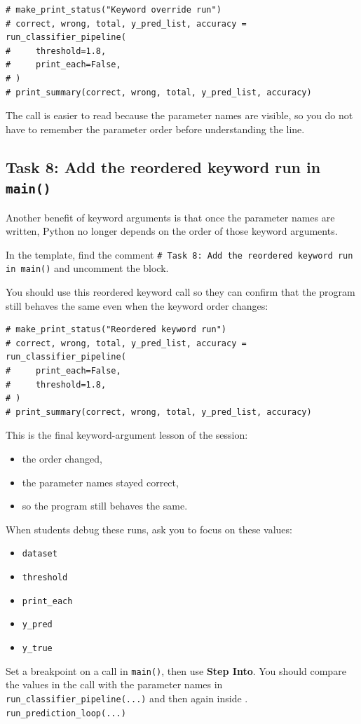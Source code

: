 \begin{verbatim}
# make_print_status("Keyword override run")
# correct, wrong, total, y_pred_list, accuracy = run_classifier_pipeline(
#     threshold=1.8,
#     print_each=False,
# )
# print_summary(correct, wrong, total, y_pred_list, accuracy)
\end{verbatim}

The call is easier to read because the parameter names are visible, so you do not have to remember the parameter order before understanding the line.

\subsection{Task 8: Add the reordered keyword run in \texttt{main()}}
Another benefit of keyword arguments is that once the parameter names are written, Python no longer depends on the order of those keyword arguments.
\begin{tcolorbox}[title=Task 8: Add the reordered keyword run in \texttt{main()}]
In the template, find the comment \texttt{\# Task 8: Add the reordered keyword run in main()} and uncomment the block.

You should use this reordered keyword call so they can confirm that the program still behaves the same even when the keyword order changes:
\end{tcolorbox}

\begin{verbatim}
# make_print_status("Reordered keyword run")
# correct, wrong, total, y_pred_list, accuracy = run_classifier_pipeline(
#     print_each=False,
#     threshold=1.8,
# )
# print_summary(correct, wrong, total, y_pred_list, accuracy)
\end{verbatim}

This is the final keyword-argument lesson of the session:
\begin{itemize}
    \item the order changed,
    \item the parameter names stayed correct,
    \item so the program still behaves the same.
\end{itemize}

\begin{tcolorbox}[title=Line-by-Line Debugging for Session 5]
When students debug these runs, ask you to focus on these values:
\begin{itemize}
    \item \texttt{dataset}
    \item \texttt{threshold}
    \item \texttt{print\_each}
    \item \texttt{y\_pred}
    \item \texttt{y\_true}
\end{itemize}

Set a breakpoint on a call in \texttt{main()}, then use \textbf{Step Into}. You should compare the values in the call with the parameter names in \texttt{run\_classifier\_pipeline(...)} and then again inside . \texttt{run\_prediction\_loop(...)}\end{tcolorbox}
